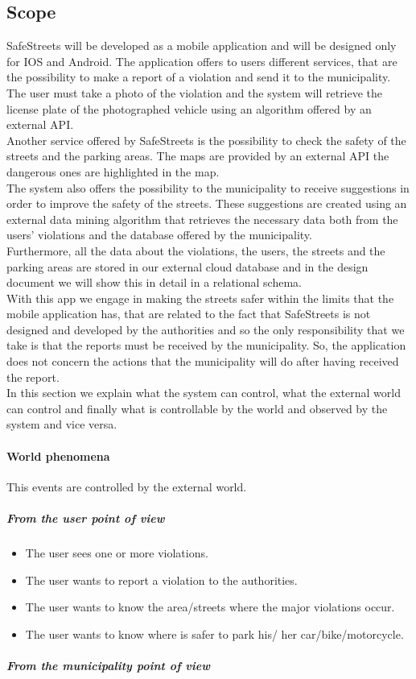\documentclass[titlepage]{article}
\begin{document}
\subsection{Scope}
SafeStreets will be developed as a mobile application and will be designed only for IOS and Android.
The application offers to users different services, that are the possibility to make a report of a violation and send it to the municipality. The user must take a photo of the violation and the system will retrieve the license plate of the photographed vehicle using an algorithm offered by an external API. \\
Another service offered by SafeStreets is the possibility to check the safety of the streets and the parking areas. The maps are provided by an external API the dangerous ones are highlighted in the map. \\
The system also offers the possibility to the municipality to receive suggestions in order to improve the safety of the streets. These suggestions are created using an external data mining algorithm that retrieves the necessary data both from the users' violations and the database offered by the municipality. \\
Furthermore, all the data about the violations, the users, the streets and the parking areas are stored in our external cloud database and in the design document we will show this in detail in a relational schema. \\



With this app we engage in making the streets safer within the limits that the mobile application has, that are related to the fact that SafeStreets is not designed and developed by the authorities and so the only responsibility that we take is that the reports must be received by the municipality. So, the application does not concern the actions that the municipality will do after having received the report. \\

In this section we explain what the system can control, what the external world can control and finally what is controllable by the world and observed by the system and vice versa.

\paragraph{World phenomena\\}
This events are controlled by the external world.
\subparagraph{From the user point of view}
\begin{itemize}	
	\item The user sees one or more violations.
	\item The user wants to report a violation to the 					  authorities.
	\item The user wants to know the area/streets where the 
	     major violations occur.
	\item The user wants to know where is safer to park his/			  her car/bike/motorcycle.

\end{itemize}
\subparagraph{From the municipality point of view }
\end{document}
